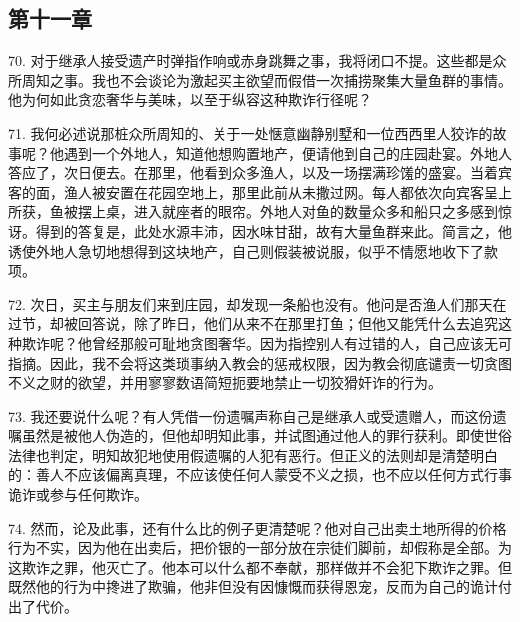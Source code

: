 
\subsection{第十一章}

\par

70. 对于继承人接受遗产时弹指作响或赤身跳舞之事，我将闭口不提。这些都是众所周知之事。我也不会谈论为激起买主欲望而假借一次捕捞聚集大量鱼群的事情。他为何如此贪恋奢华与美味，以至于纵容这种欺诈行径呢？\par

71. 我何必述说那桩众所周知的、关于一处惬意幽静别墅和一位西西里人狡诈的故事呢？他遇到一个外地人，知道他想购置地产，便请他到自己的庄园赴宴。外地人答应了，次日便去。在那里，他看到众多渔人，以及一场摆满珍馐的盛宴。当着宾客的面，渔人被安置在花园空地上，那里此前从未撒过网。每人都依次向宾客呈上所获，鱼被摆上桌，进入就座者的眼帘。外地人对鱼的数量众多和船只之多感到惊讶。得到的答复是，此处水源丰沛，因水味甘甜，故有大量鱼群来此。简言之，他诱使外地人急切地想得到这块地产，自己则假装被说服，似乎不情愿地收下了款项。\par

72. 次日，买主与朋友们来到庄园，却发现一条船也没有。他问是否渔人们那天在过节，却被回答说，除了昨日，他们从来不在那里打鱼；但他又能凭什么去追究这种欺诈呢？他曾经那般可耻地贪图奢华。因为指控别人有过错的人，自己应该无可指摘。因此，我不会将这类琐事纳入教会的惩戒权限，因为教会彻底谴责一切贪图不义之财的欲望，并用寥寥数语简短扼要地禁止一切狡猾奸诈的行为。\par

73. 我还要说什么呢？有人凭借一份遗嘱声称自己是继承人或受遗赠人，而这份遗嘱虽然是被他人伪造的，但他却明知此事，并试图通过他人的罪行获利。即使世俗法律也判定，明知故犯地使用假遗嘱的人犯有恶行。但正义的法则却是清楚明白的：善人不应该偏离真理，不应该使任何人蒙受不义之损，也不应以任何方式行事诡诈或参与任何欺诈。\par

74. 然而，论及此事，还有什么比的例子更清楚呢？他对自己出卖土地所得的价格行为不实，因为他在出卖后，把价银的一部分放在宗徒们脚前，却假称是全部。为这欺诈之罪，他灭亡了。他本可以什么都不奉献，那样做并不会犯下欺诈之罪。但既然他的行为中搀进了欺骗，他非但没有因慷慨而获得恩宠，反而为自己的诡计付出了代价。\par

